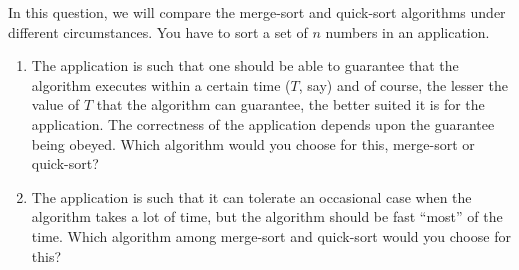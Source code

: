 In this question, we will compare the merge-sort and quick-sort
algorithms under different circumstances.
You have to sort a set of $n$ numbers in an application.
\begin{enumerate}
\item  The application is such that one should be able to guarantee
that the algorithm executes within a certain time ($T$, say) and of
course, the lesser the value of $T$ that the algorithm can guarantee,
the better suited it is for the application. The correctness of the
application depends upon the guarantee being obeyed. Which algorithm
would you choose for this, merge-sort or quick-sort?

\item  The application is such that it can tolerate an occasional case
when the algorithm takes a lot of time, but the algorithm should be
fast ``most'' of the time. Which algorithm among merge-sort and
quick-sort would you choose for this?
\end{enumerate}

